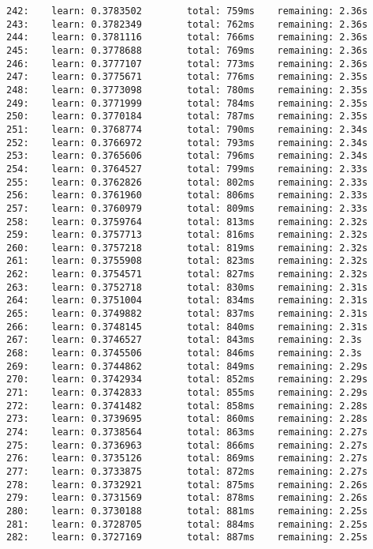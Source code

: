 \documentclass[11pt]{article}
\begin{document}
\begin{Verbatim}[commandchars=\\\{\}]
242:    learn: 0.3783502        total: 759ms    remaining: 2.36s
243:    learn: 0.3782349        total: 762ms    remaining: 2.36s
244:    learn: 0.3781116        total: 766ms    remaining: 2.36s
245:    learn: 0.3778688        total: 769ms    remaining: 2.36s
246:    learn: 0.3777107        total: 773ms    remaining: 2.36s
247:    learn: 0.3775671        total: 776ms    remaining: 2.35s
248:    learn: 0.3773098        total: 780ms    remaining: 2.35s
249:    learn: 0.3771999        total: 784ms    remaining: 2.35s
250:    learn: 0.3770184        total: 787ms    remaining: 2.35s
251:    learn: 0.3768774        total: 790ms    remaining: 2.34s
252:    learn: 0.3766972        total: 793ms    remaining: 2.34s
253:    learn: 0.3765606        total: 796ms    remaining: 2.34s
254:    learn: 0.3764527        total: 799ms    remaining: 2.33s
255:    learn: 0.3762826        total: 802ms    remaining: 2.33s
256:    learn: 0.3761960        total: 806ms    remaining: 2.33s
257:    learn: 0.3760979        total: 809ms    remaining: 2.33s
258:    learn: 0.3759764        total: 813ms    remaining: 2.32s
259:    learn: 0.3757713        total: 816ms    remaining: 2.32s
260:    learn: 0.3757218        total: 819ms    remaining: 2.32s
261:    learn: 0.3755908        total: 823ms    remaining: 2.32s
262:    learn: 0.3754571        total: 827ms    remaining: 2.32s
263:    learn: 0.3752718        total: 830ms    remaining: 2.31s
264:    learn: 0.3751004        total: 834ms    remaining: 2.31s
265:    learn: 0.3749882        total: 837ms    remaining: 2.31s
266:    learn: 0.3748145        total: 840ms    remaining: 2.31s
267:    learn: 0.3746527        total: 843ms    remaining: 2.3s
268:    learn: 0.3745506        total: 846ms    remaining: 2.3s
269:    learn: 0.3744862        total: 849ms    remaining: 2.29s
270:    learn: 0.3742934        total: 852ms    remaining: 2.29s
271:    learn: 0.3742833        total: 855ms    remaining: 2.29s
272:    learn: 0.3741482        total: 858ms    remaining: 2.28s
273:    learn: 0.3739695        total: 860ms    remaining: 2.28s
274:    learn: 0.3738564        total: 863ms    remaining: 2.27s
275:    learn: 0.3736963        total: 866ms    remaining: 2.27s
276:    learn: 0.3735126        total: 869ms    remaining: 2.27s
277:    learn: 0.3733875        total: 872ms    remaining: 2.27s
278:    learn: 0.3732921        total: 875ms    remaining: 2.26s
279:    learn: 0.3731569        total: 878ms    remaining: 2.26s
280:    learn: 0.3730188        total: 881ms    remaining: 2.25s
281:    learn: 0.3728705        total: 884ms    remaining: 2.25s
282:    learn: 0.3727169        total: 887ms    remaining: 2.25s

\end{Verbatim}
\end{document}
